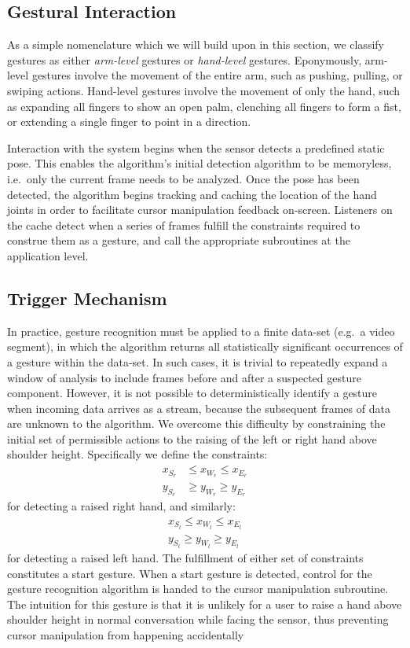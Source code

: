 \documentclass{scrartcl}
\numberwithin{equation}{section}
\begin{document}
    \subsection{Gestural Interaction\label{sec:phase3}}
      As a simple nomenclature which we will build upon in this section, we classify gestures as either \emph{arm-level} gestures or \emph{hand-level} gestures. Eponymously, arm-level gestures involve the movement of the entire arm, such as pushing, pulling, or swiping actions. Hand-level gestures involve the movement of only the hand, such as expanding all fingers to show an open palm, clenching all fingers to form a fist, or extending a single finger to point in a direction.

      Interaction with the system begins when the sensor detects a predefined static pose. This enables the algorithm's initial detection algorithm to be memoryless, i.e.~only the current frame needs to be analyzed. Once the pose has been detected, the algorithm begins tracking and caching the location of the hand joints in order to facilitate cursor manipulation feedback on-screen. Listeners on the cache detect when a series of frames fulfill the constraints required to construe them as a gesture, and call the appropriate subroutines at the application level.
      \subsection{Trigger Mechanism}
      In practice, gesture recognition must be applied to a finite data-set (e.g.~a video segment), in which the algorithm returns all statistically significant occurrences of a gesture within the data-set. In such cases, it is trivial to repeatedly expand a window of analysis to include frames before and after a suspected gesture component. However, it is not possible to deterministically identify a gesture when incoming data arrives as a stream, because the subsequent frames of data are unknown to the algorithm. We overcome this difficulty by constraining the initial set of permissible actions to the raising of the left or right hand above shoulder height. Specifically we define the constraints:
      \begin{align}
        x_{S_r} &\leq x_{W_r} \leq x_{E_r} \\
        y_{S_r} &\geq y_{W_r} \geq y_{E_r}
      \end{align}
      for detecting a raised right hand, and similarly:
      \begin{align}
        x_{S_l} \leq x_{W_l} \leq x_{E_l} \\
        y_{S_l} \geq y_{W_l} \geq y_{E_l}
      \end{align}
      for detecting a raised left hand. The fulfillment of either set of constraints constitutes a start gesture. When a start gesture is detected, control for the gesture recognition algorithm is handed to the cursor manipulation subroutine. The intuition for this gesture is that it is unlikely for a user to raise a hand above shoulder height in normal conversation while facing the sensor, thus preventing cursor manipulation from happening accidentally
\end{document}
